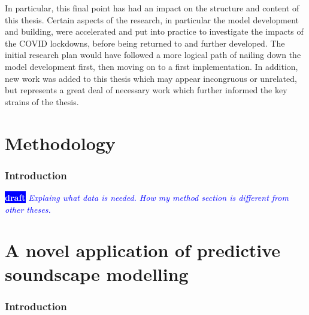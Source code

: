 \documentclass[twoside,fontsize=12pt,titlepage,chapterprefix=true
]{scrbook}
\newcommand{\remark}[3]{%
    {\colorbox{#2}{\sffamily\scriptsize\bfseries\textcolor{white}{#1}}}
    {\sffamily\small\itshape\textcolor{#2}{#3}}
}
\newcommand{\draft}[1]{\remark{draft}{blue}{#1}}
\begin{document}
In particular, this final point has had an impact on the structure and content of this thesis. Certain aspects of the research, in particular the model development and building, were accelerated and put into practice to investigate the impacts of the COVID lockdowns, before being returned to and further developed. The initial research plan would have followed a more logical path of nailing down the model development first, then moving on to a first implementation. In addition, new work was added to this thesis which may appear incongruous or unrelated, but represents a great deal of necessary work which further informed the key strains of the thesis.


\tableofcontents

\listoffigures
\listoftables


\mainmatter




\part{Methodology}
\section*{Introduction}

\draft{Explaing what data is needed. How my method section is different from other theses.}




\part{A novel application of predictive soundscape modelling}
\section*{Introduction}
\end{document}
